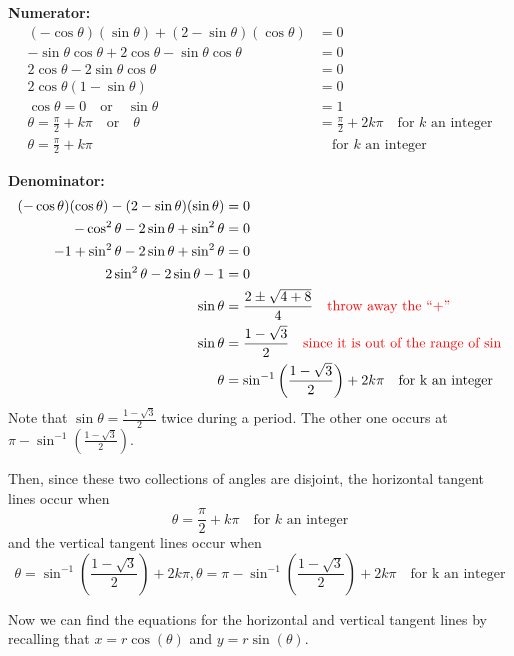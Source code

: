 \documentclass[handout]{ximera}
\begin{document}
\begin{problem}
\begin{freeResponse}
	{\bf Numerator:}
		\begin{align*}
		(- \cos \theta)(\sin \theta) + (2 - \sin \theta)(\cos \theta) &= 0  \\
		- \sin \theta \cos \theta + 2 \cos \theta - \sin \theta \cos \theta &= 0  \\
		2 \cos \theta - 2 \sin \theta \cos \theta &= 0  \\
		2 \cos \theta (1 - \sin \theta) &= 0  \\
		\cos \theta = 0 \quad \text{or} \quad \sin \theta &= 1  \\
		\theta = \frac{\pi}{2} + k \pi  \quad  \text{or}  \quad  \theta &= \frac{\pi}{2} + 2k\pi \quad \text{for } k \text{ an integer}  \\
		\theta = \frac{\pi}{2} + k \pi  &\quad \text{for } k \text{ an integer}
		\end{align*}
		
	{\bf Denominator:}
		\begin{align*}
		(-\cos \theta)(\cos \theta) - (2 - \sin \theta)(\sin \theta) &= 0  \\
		- \cos^2 \theta - 2 \sin \theta + \sin^2 \theta &= 0  \\
		-1 + \sin^2 \theta - 2 \sin \theta + \sin^2 \theta &= 0  \\
		2 \sin^2 \theta - 2 \sin \theta - 1 &= 0  \\
		\sin \theta &= \frac{2 \pm \sqrt{4 + 8}}{4}  	\quad  {\color{red}\text{throw away the ``+'' }}\\
		\sin \theta &= \frac{1 - \sqrt{3}}{2}  \quad {\color{red}\text{since it is out of the range of sin}}\\
		\theta &= \sin^{-1} \left( \frac{1-\sqrt{3}}{2} \right) + 2 k \pi 	\quad \text{for k an integer}
		\end{align*}
	Note that $\sin \theta = \frac{1-\sqrt{3}}{2}$ twice during a period. The other one occurs at $\pi - \sin^{-1}\left(\frac{1-\sqrt{3}}{2}\right)$. 
		
	Then, since these two collections of angles are disjoint, the horizontal tangent lines occur when
		\[
		\boxed{\theta = \frac{\pi}{2} + k \pi}  \quad \text{for } k \text{ an integer}
		\]
	and the vertical tangent lines occur when
		\[
		\boxed{\theta = \sin^{-1} \left( \frac{1-\sqrt{3}}{2} \right) + 2 k \pi, \theta = \pi - \sin^{-1}\left(\frac{1-\sqrt{3}}{2}\right)+2k \pi} 	\quad \text{for k an integer}
		\]
		
		Now we can find the equations for the horizontal and vertical tangent lines by recalling that $x=r\cos(\theta)$ and $y=r\sin(\theta)$.   \\
		

\end{freeResponse}
\end{problem}
\end{document}
